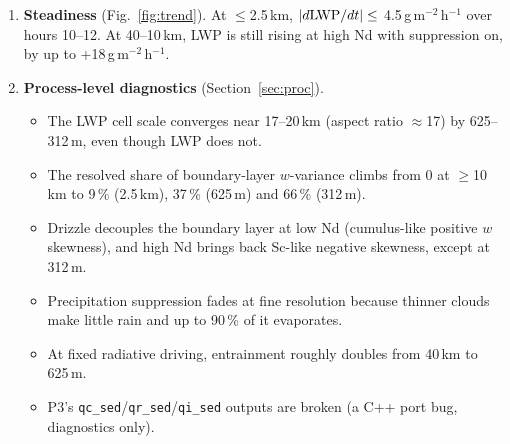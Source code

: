 \documentclass[10pt]{article}
\begin{document}
\begin{enumerate}
At 312\,m (33 pairs, Nd 20--1000), $|\Delta{\rm LWP}| \leq$ 1.0\,g\,m$^{-2}$ and $|\Delta{\rm cloud\ cover}| \leq$ 0.006.
The one consistent signal is $w_e$, which is 0.02--0.07\,mm\,s$^{-1}$ lower ($<$1\,\%).
\item \textbf{Steadiness} (Fig.~\ref{fig:trend}). At $\leq$2.5\,km, $|d{\rm LWP}/dt| \leq$ 4.5\,g\,m$^{-2}$\,h$^{-1}$ over hours 10--12.
At 40--10\,km, LWP is still rising at high Nd with suppression on, by up to +18\,g\,m$^{-2}$\,h$^{-1}$.
\item \textbf{Process-level diagnostics} (Section~\ref{sec:proc}).
\begin{itemize}
\item The LWP cell scale converges near 17--20\,km (aspect ratio $\approx$17) by 625--312\,m, even though LWP does not.
\item The resolved share of boundary-layer $w$-variance climbs from 0 at $\geq$10\,km to 9\,\% (2.5\,km), 37\,\% (625\,m) and 66\,\% (312\,m).
\item Drizzle decouples the boundary layer at low Nd (cumulus-like positive $w$ skewness), and high Nd brings back Sc-like negative skewness, except at 312\,m.
\item Precipitation suppression fades at fine resolution because thinner clouds make little rain and up to 90\,\% of it evaporates.
\item At fixed radiative driving, entrainment roughly doubles from 40\,km to 625\,m.
\item P3's \texttt{qc\_sed}/\texttt{qr\_sed}/\texttt{qi\_sed} outputs are broken (a C++ port bug, diagnostics only).
\end{itemize}
\end{enumerate}
\end{document}
